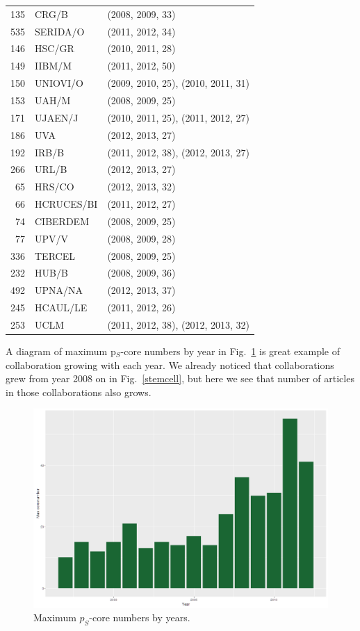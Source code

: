 \documentclass[a4paper,twoside,10pt]{article}
\begin{document}
\begin{center}
\begin{longtable}{rlp{8.5cm}}
135 & CRG/B        &(2008, 2009, 33)\\
535 & SERIDA/O     &(2011, 2012, 34)\\
146 & HSC/GR       &(2010, 2011, 28)\\
149 & IIBM/M       &(2011, 2012, 50)\\
150 & UNIOVI/O     &(2009, 2010, 25), (2010, 2011, 31)\\
153 & UAH/M        &(2008, 2009, 25)\\
171 & UJAEN/J      &(2010, 2011, 25), (2011, 2012, 27)\\
186 & UVA          &(2012, 2013, 27)\\
192 & IRB/B        &(2011, 2012, 38), (2012, 2013, 27)\\
266 & URL/B        &(2012, 2013, 27)\\
 65 & HRS/CO       &(2012, 2013, 32)\\
 66 & HCRUCES/BI   &(2011, 2012, 27)\\
 74 & CIBERDEM     &(2008, 2009, 25)\\
 77 & UPV/V        &(2008, 2009, 28)\\
336 & TERCEL       &(2008, 2009, 25)\\
232 & HUB/B        &(2008, 2009, 36)\\
492 & UPNA/NA      &(2012, 2013, 37)\\
245 & HCAUL/LE     &(2011, 2012, 26)\\
253 & UCLM         &(2011, 2012, 38), (2012, 2013, 32)
\end{longtable}
\end{center}

A diagram of maximum p$_S$-core numbers by year in Fig.~\ref{stemcellps} is great example of collaboration growing with each year. We already noticed that collaborations grew from year 2008 on in Fig.~\ref{stemcell}, but here we see that number of articles in those collaborations also grows.

\begin{figure}[!h]
	\centering
	\includegraphics[width=\textwidth]{./pics/maxPsCore.png}
  \caption{Maximum $p_S$-core numbers by years.}
  \label{stemcellps}
\end{figure}
\end{document}
